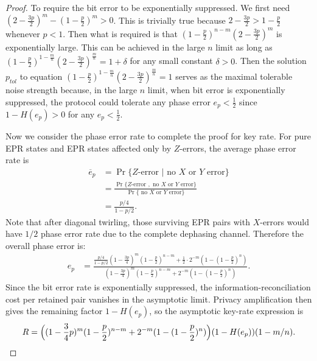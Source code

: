\documentclass[onecolumn,prx,longbibliography,nofootinbib, superscriptaddress]{revtex4-2}
\theoremstyle{recap}
\begin{document}
\begin{proof}
    To require the bit error to be exponentially suppressed. We first need $(2-\frac{3p}{2})^{m}-(1-\frac{p}{2})^{m}>0$. This is trivially true because $2-\frac{3p}{2}>1-\frac{p}{2}$ whenever $p<1$. Then what is required is that $(1-\frac{p}{2})^{n-m}(2-\frac{3p}{2})^{m}$ is exponentially large. This can be achieved in the large $n$ limit as long as $(1-\frac{p}{2})^{1-\frac{m}{n}}(2-\frac{3p}{2})^{\frac{m}{n}}=1+\delta$ for any small constant $\delta>0$. Then the solution $p_{tol}$ to equation $(1-\frac{p}{2})^{1-\frac{m}{n}}(2-\frac{3p}{2})^{\frac{m}{n}}=1$ serves as the maximal tolerable noise strength because, in the large $n$ limit, when bit error is exponentially suppressed, the protocol could tolerate any phase error $e_p<\frac{1}{2}$ since $1-H(e_p)>0$ for any $e_p<\frac{1}{2}$. 

    Now we consider the phase error rate to complete the proof for key rate. For pure EPR states and EPR states affected only by $Z$-errors, the average phase error rate is
    \begin{equation}
    \begin{split}
        \overline{e}_p&=\Pr\{\text{$Z$-error }|\text{ no $X$ or $Y$ error}\}\\
        &=\frac{\Pr\{\text{$Z$-error },\text{ no $X$ or $Y$ error}\}}{\Pr\{\text{ no $X$ or $Y$ error}\}}\\
        &=\frac{p/4}{1-p/2}.
    \end{split}
    \end{equation}
    Note that after diagonal twirling, those surviving EPR pairs with $X$-errors would have $1/2$ phase error rate due to the complete dephasing channel. Therefore the overall phase error is:
    \begin{equation}\label{eq:ep}
    \begin{split}
        e_p&=\frac{\frac{p/4}{1-p/2}(1-\frac{3p}{4})^{m}(1-\frac{p}{2})^{n-m}+\frac{1}{2}\cdot2^{-m}(1-(1-\frac{p}{2})^{n})}{(1-\frac{3p}{4})^{m}(1-\frac{p}{2})^{n-m}+2^{-m}(1-(1-\frac{p}{2})^{n})}.
    \end{split}
    \end{equation}
    Since the bit error rate is exponentially suppressed, the information-reconciliation cost per retained pair vanishes in the asymptotic limit. Privacy amplification then gives the remaining factor $1-H(e_p)$, so the asymptotic key-rate expression is
    \begin{equation}
        R=\Bigl((1-\frac{3}{4}p)^{m}(1-\frac{p}{2})^{n-m}+2^{-m}(1-(1-\frac{p}{2})^{n})\Bigr)(1-H(e_p))(1-m/n).
    \end{equation}
\end{proof}
\end{document}
